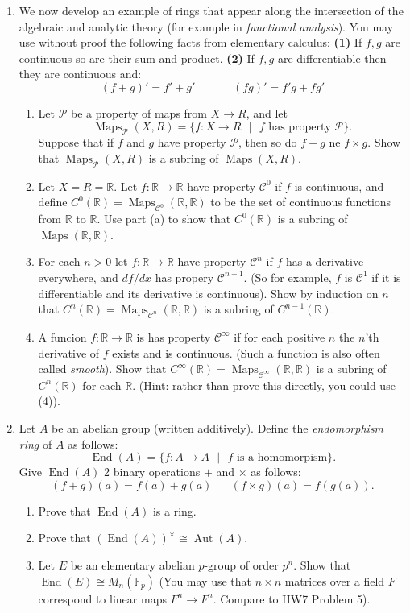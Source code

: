 \documentclass[11pt]{article}
\newcommand{\Aut}{\operatorname{Aut}}
\newcommand{\maps}{\operatorname{Maps}}
\newcommand{\bF}{\mathbb{F}}
\newcommand{\bR}{\mathbb{R}}
\newcommand{\sC}{\mathscr{C}}
\newcommand{\sP}{\mathscr{P}}
\begin{document}
\begin{enumerate}
{  }
  \item{
  We now develop an example of rings that appear along the intersection of the algebraic and analytic theory (for example in \textit{functional analysis}).  You may use without proof the following facts from elementary calculus: \textbf{(1)} If $f,g$ are continuous so are their sum and product.  \textbf{(2)} If $f,g$ are differentiable then they are continuous and:
  \[(f+g)' = f'+g'\hspace{40pt}(fg)' = f'g+fg'\]
  \begin{enumerate}
    \item{
    Let $\sP$ be a property of maps from $X\to R$, and let
    \[\maps_\sP(X,R) = \{f:X\to R\text{ }|\text{ }f\text{ has property }\sP\}.\]
    Suppose that if $f$ and $g$ have property $\sP$, then so do $f-g$ ne $f\times g$.  Show that $\maps_\sP(X,R)$ is a subring of $\maps(X,R)$.
    }
    \item{
    Let $X = R = \bR$.  Let $f:\bR\to\bR$ have property $\sC^0$ if $f$ is continuous, and define $C^0(\bR) = \maps_{\sC^0}(\bR,\bR)$ to be the set of continuous functions from $\bR$ to $\bR$.  Use part (a) to show that $C^0(\bR)$ is a subring of $\maps(\bR,\bR)$.
    }
    \item{
    For each $n>0$ let $f:\bR\to\bR$ have property $\sC^n$ if $f$ has a derivative everywhere, and $df/dx$ has propery $\sC^{n-1}$.  (So for example, $f$ is $\sC^1$ if it is differentiable and its derivative is continuous). Show by induction on $n$ that $C^n(\bR) = \maps_{\sC^n}(\bR,\bR)$ is a subring of $C^{n-1}(\bR)$.
    }
    \item{
    A funcion $f:\bR\to\bR$ is has property $\sC^\infty$ if for each positive $n$ the $n$'th derivative of $f$ exists and is continuous.  (Such a function is also often called \textit{smooth}).  Show that $C^\infty(\bR) = \maps_{\sC^{\infty}}(\bR,\bR)$ is a subring of $C^{n}(\bR)$ for each $\bR$.  (Hint: rather than prove this directly, you could use (4)).
    }
  \end{enumerate}
  }
  \item{
  Let $A$ be an abelian group (written additively).  Define the \textit{endomorphism ring} of $A$ as follows:
  \[\operatorname{End}(A) = \{f:A\to A\text{ }|\text{ }f\text{ is a homomorpism}\}.\]
  Give $\operatorname{End}(A)$ 2 binary operations $+$ and $\times$ as follows:
  \[(f+g)(a) = f(a)+g(a)\hspace{20pt}(f\times g)(a) = f(g(a)).\]
  \begin{enumerate}
    \item{
    Prove that $\operatorname{End}(A)$ is a ring.
    }
    \item{
    Prove that $(\operatorname{End}(A))^\times\cong\Aut(A)$.
    }
    \item{
    Let $E$ be an elementary abelian $p$-group of order $p^n$.  Show that $\operatorname{End}(E)\cong M_n(\bF_p)$ (You may use that $n\times n$ matrices over a field $F$ correspond to linear maps $F^n\to F^n$.  Compare to HW7 Problem 5).
    }
  \end{enumerate}
  }
\end{enumerate}
\end{document}
